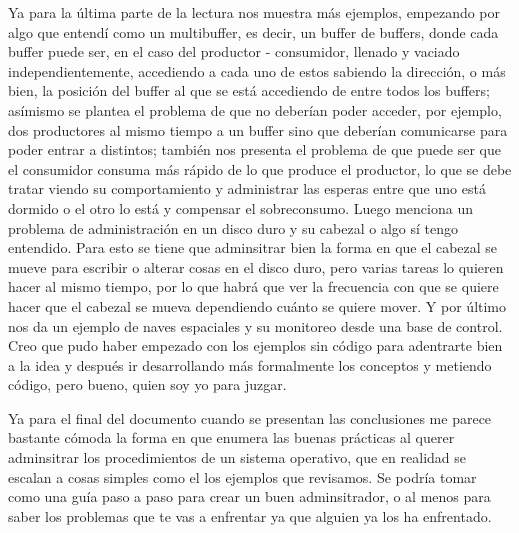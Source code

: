 \documentclass[twocolumn, letterpaper,aps,pra,10pt]{revtex4-1}
\begin{document}
Ya para la última parte de la lectura nos muestra más ejemplos, empezando por algo que entendí como un multibuffer, es decir, un buffer de buffers, donde cada buffer puede ser, en el caso del productor - consumidor, llenado y vaciado independientemente, accediendo a cada uno de estos sabiendo la dirección, o más bien, la posición del buffer al que se está accediendo de entre todos los buffers; asímismo se plantea el problema de que no deberían poder acceder, por ejemplo, dos productores al mismo tiempo a un buffer sino que deberían comunicarse para poder entrar a distintos; también nos presenta el problema de que puede ser que el consumidor consuma más rápido de lo que produce el productor, lo que se debe tratar viendo su comportamiento y administrar las esperas entre que uno está dormido o el otro lo está y compensar el sobreconsumo. Luego menciona un problema de administración en un disco duro y su cabezal o algo sí tengo entendido. Para esto se tiene que adminsitrar bien la forma en que el cabezal se mueve para escribir o alterar cosas en el disco duro, pero varias tareas lo quieren hacer al mismo tiempo, por lo que habrá que ver la frecuencia con que se quiere hacer que el cabezal se mueva dependiendo cuánto se quiere mover. Y por último nos da un ejemplo de naves espaciales y su monitoreo desde una base de control. Creo que pudo haber empezado con los ejemplos sin código para adentrarte bien a la idea y después ir desarrollando más formalmente los conceptos y metiendo código, pero bueno, quien soy yo para juzgar. 

Ya para el final del documento cuando se presentan las conclusiones me parece bastante cómoda la forma en que enumera las buenas prácticas al querer adminsitrar los procedimientos de un sistema operativo, que en realidad se escalan a cosas simples como el los ejemplos que revisamos. Se podría tomar como una guía paso a paso para crear un buen adminsitrador, o al menos para saber los problemas que te vas a enfrentar ya que alguien ya los ha enfrentado.
\end{document}

